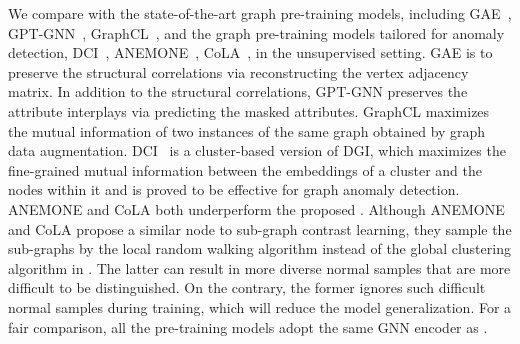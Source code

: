 We compare \spmodel with the state-of-the-art graph pre-training models, including GAE~\cite{kipf2016variational}, GPT-GNN~\cite{hu2020gpt}, GraphCL~\cite{you2020graph}, and the graph pre-training models tailored for anomaly detection, DCI~\cite{wang2021decoupling}, ANEMONE~\cite{jin2021anemone}, CoLA~\cite{liu2021anomaly}, in the unsupervised setting. 
GAE is to preserve the structural correlations via reconstructing the vertex adjacency matrix. In addition to the structural correlations, GPT-GNN preserves the attribute interplays via predicting the masked attributes. 
GraphCL maximizes the mutual information of two instances of the same graph obtained by graph data augmentation.  
DCI~\cite{wang2021decoupling} is a cluster-based version of DGI, 
which maximizes the fine-grained mutual information between the embeddings of a cluster and the nodes within it and is proved to be effective for graph anomaly detection. 
ANEMONE and CoLA both underperform the proposed \pmodel. Although ANEMONE and CoLA propose a similar node to sub-graph contrast learning, they sample the sub-graphs by the local random walking algorithm instead of the global clustering algorithm in \pmodel. The latter can result in more diverse normal samples that are more difficult to be distinguished. On the contrary, the former ignores such difficult normal samples during training, which will reduce the model generalization.
For a fair comparison, all the pre-training models adopt the same GNN encoder as \model.





